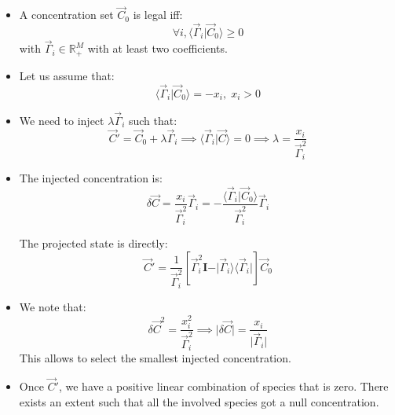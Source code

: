 \documentclass[aps,12pt]{revtex4}
\begin{document}
\begin{itemize}
\item
A concentration set $\vec C_0$ is legal iff:
\begin{equation}
\forall i, \langle \vec \Gamma _i \vert \vec C_0 \rangle \geq 0
\end{equation}
with $\vec \Gamma _i \in \mathbb{R}_+^M$ with at least two coefficients.

\item
Let us assume that:
\begin{equation}
	\langle \vec \Gamma _i \vert \vec C_0 \rangle  = - x_i,\; x_i>0
\end{equation}
 
\item We need to inject $\lambda \vec \Gamma _i$ such that:
\begin{equation}
	\vec C' = \vec C_0 + \lambda \vec \Gamma _i \implies \langle \vec \Gamma _i \vert \vec C \rangle = 0 \implies \lambda = \dfrac{x_i}{\vec \Gamma_i^2}
\end{equation}

\item The injected concentration is:
\begin{equation}
\boxed{
	\delta \vec C = \dfrac{x_i}{\vec \Gamma_i^2} \vec \Gamma_i = - \dfrac{\langle \vec \Gamma _i \vert \vec C_0 \rangle}{\vec \Gamma_i^2}\vec \Gamma_i 
	}
\end{equation} 

The projected state is directly:
\begin{equation}
	\vec C' = \dfrac{1}{\vec \Gamma_i^2}\left[ \vec \Gamma_i^2 \bm{I} -  \vert \vec \Gamma _i \rangle \langle \vec \Gamma _i \vert\right] \vec C_0
\end{equation}

\item We note that:
\begin{equation}
	\delta \vec C ^2 = \dfrac{x_i^2}{\vec \Gamma_i^2} \implies  \boxed{\vert \delta \vec C  \vert = \dfrac{x_i}{ \vert \vec \Gamma_i \vert}}
\end{equation}
This allows to select the smallest injected concentration.

\item Once $\vec C'$, we have a positive linear combination of species that is zero. There exists an extent such that all the involved species got a null concentration.

% 
%

\end{itemize}
\end{document}
